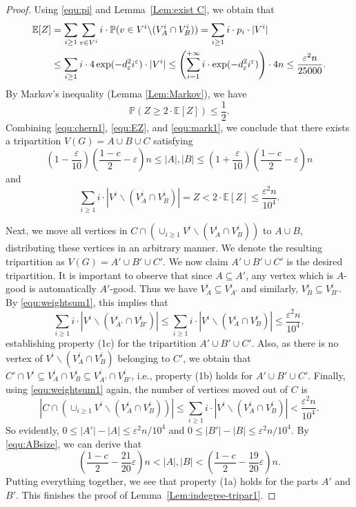 \documentclass{aic}
\newcommand{\E}{{\mathbb{E}}}
\newcommand{\Prob}{{\mathbb{P}}}
\begin{document}
\begin{proof}
		Using \eqref{equ:pi} and Lemma~\ref{Lem:exist C}, we obtain that
		\begin{align}\notag
			\E[Z]&=\sum_{i\geq 1}\sum_{v\in V^i}i\cdot \Prob(v\in V^i\backslash (V^i_A\cap V^i_B))=\sum_{i\geq 1}i\cdot p_i\cdot |V^i|\\
			&\leq \sum_{i\geq 1} i\cdot 4\exp(-d_\varepsilon^2i^{\varepsilon})\cdot|V^i|\leq
			\left(\sum_{i=1}^{+\infty}i\cdot \exp(-d_\varepsilon^2i^{\varepsilon})\right)\cdot 4n\le \frac{\varepsilon^2n}{25000}.\label{equ:EZ}
		\end{align}
		By Markov's inequality (Lemma \ref{Lem:Markov}), we have
		\begin{equation}\label{equ:mark1}
			\Prob\left(Z\ge 2\cdot \E[Z]\right)\le \frac{1}{2}.
		\end{equation}
		Combining \eqref{equ:chern1}, \eqref{equ:EZ}, and \eqref{equ:mark1}, we conclude that there exists a tripartition $V(G)=A\cup B\cup C$ satisfying
		\begin{equation}\label{equ:ABsize}
			\left(1-\frac{\varepsilon}{10}\right)\left(\frac{1-c}{2}-\varepsilon\right)n\leq |A|,|B|\leq \left(1+\frac{\varepsilon}{10}\right)\left(\frac{1-c}{2}-\varepsilon\right)n
		\end{equation}
		and
		\begin{equation}
			\label{equ:weightsum1}
			\sum_{i\geq 1} i\cdot |V^i\backslash (V^i_A\cap V^i_B)|=Z<2\cdot \E[Z]\leq \frac{\varepsilon^2n}{10^4}.
		\end{equation}
		
		Next, we move all vertices in $C\cap\left(\cup_{i\ge 1} V^i\backslash (V^i_A\cap V^i_B)\right)$ to $A\cup B$,
		distributing these vertices in an arbitrary manner. We denote the resulting tripartition as $V(G)=A'\cup B'\cup C'$.
		We now claim $A'\cup B'\cup C'$ is the desired tripartition.
		It is important to observe that since $A\subseteq A'$, any vertex which is $A$-good is automatically $A'$-good.
		Thus we have $V^i_A\subseteq V^i_{A'}$ and similarly, $V^i_B\subseteq V^i_{B'}$.
		By \eqref{equ:weightsum1}, this implies that
		$$ \sum_{i\geq 1} i\cdot |V^i\backslash (V^i_{A'}\cap V^i_{B'})|\leq \sum_{i\geq 1} i\cdot |V^i\backslash (V^i_A\cap V^i_B)|\leq \frac{\varepsilon^2n}{10^4},$$
		establishing property (1c) for the tripartition $A'\cup B'\cup C'$.
		Also, as there is no vertex of $V^i\backslash (V^i_A\cap V^i_B)$ belonging to $C'$, we obtain that $C'\cap V^i\subseteq V^i_A\cap V^i_B\subseteq V^i_{A'}\cap V^i_{B'}$,
		i.e., property (1b) holds for $A'\cup B'\cup C'$.
		Finally, using \eqref{equ:weightsum1} again,
		the number of vertices moved out of $C$ is $$|C\cap\left(\cup_{i\ge 1} V^i\backslash (V^i_A\cap V^i_B)\right)|\leq \sum_{i\geq 1} i\cdot |V^i\backslash (V^i_A\cap V^i_B)|<\frac{\varepsilon^2n}{10^4}.$$
		So evidently, $0\le |A'|-|A|\le \varepsilon^2n/10^4$ and $0\le |B'|-|B|\le \varepsilon^2n/10^4$.
		By \eqref{equ:ABsize}, we can derive that $$\left(\frac{1-c}{2}-\frac{21}{20}\varepsilon\right)n< |A|,|B|<\left(\frac{1-c}{2}-\frac{19}{20}\varepsilon\right)n.$$
		Putting everything together, we see that property (1a) holds for the parts $A'$ and $B'$.
		This finishes the proof of Lemma~\ref{Lem:indegree-tripar1}.
	\end{proof}
	
\end{document}
